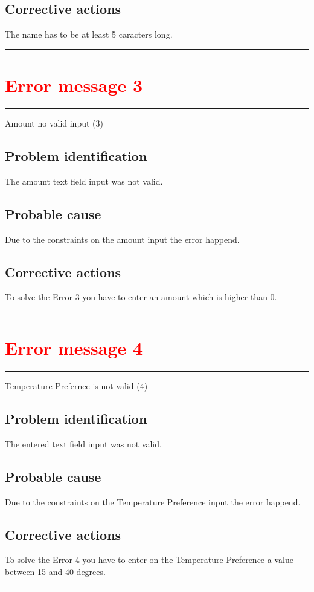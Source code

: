 \subsection{Corrective actions}
The name has to be at least 5 caracters long.
\vspace{0.5cm}
\hrule
\hfill
\section{\textbf{\textcolor{red}{Error message 3}}}
\hrule
\vspace{0.5cm}
Amount no valid input (3)
\subsection{Problem identification}
The amount text field input was not valid.

\subsection{Probable cause}
Due to the constraints on the amount input the error happend.

\subsection{Corrective actions}
To solve the Error 3 you have to enter an amount which is higher than 0.
\vspace{0.5cm}
\hrule
\break

\section{\textbf{\textcolor{red}{Error message 4}}}
\hrule
\vspace{0.5cm}
Temperature Prefernce is not valid (4)

\subsection{Problem identification}
The entered text field input was not valid.

\subsection{Probable cause}
Due to the constraints on the Temperature Preference input the error happend.

\subsection{Corrective actions}
To solve the Error 4 you have to enter on the Temperature Preference a value
between 15 and 40 degrees.
\vspace{0.5cm}
\hrule
\hfill
